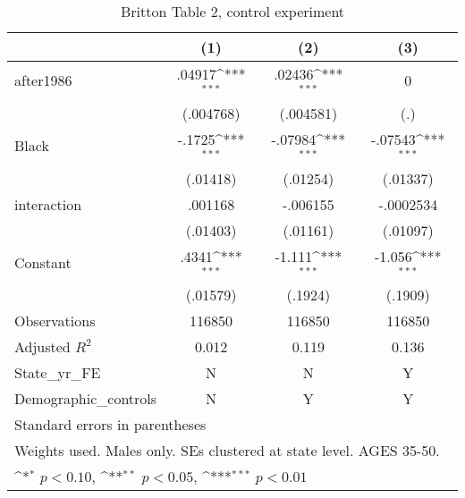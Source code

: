 \begin{table}[htbp]\centering
\def\sym#1{\ifmmode^{#1}\else\(^{#1}\)\fi}
\caption{Britton Table 2, control experiment}
\begin{tabular}{l*{3}{c}}
\hline\hline
                    &\multicolumn{1}{c}{(1)}         &\multicolumn{1}{c}{(2)}         &\multicolumn{1}{c}{(3)}         \\
\hline
after1986           &      .04917\sym{***}&      .02436\sym{***}&           0         \\
                    &   (.004768)         &   (.004581)         &         (.)         \\
[1em]
Black               &      -.1725\sym{***}&     -.07984\sym{***}&     -.07543\sym{***}\\
                    &    (.01418)         &    (.01254)         &    (.01337)         \\
[1em]
interaction         &     .001168         &    -.006155         &   -.0002534         \\
                    &    (.01403)         &    (.01161)         &    (.01097)         \\
[1em]
Constant            &       .4341\sym{***}&      -1.111\sym{***}&      -1.056\sym{***}\\
                    &    (.01579)         &     (.1924)         &     (.1909)         \\
\hline
Observations        &      116850         &      116850         &      116850         \\
Adjusted \(R^{2}\)  &       0.012         &       0.119         &       0.136         \\
State\_yr\_FE         &           N         &           N         &           Y         \\
Demographic\_controls&           N         &           Y         &           Y         \\
\hline\hline
\multicolumn{4}{l}{\footnotesize Standard errors in parentheses}\\
\multicolumn{4}{l}{\footnotesize Weights used. Males only. SEs clustered at state level. AGES 35-50.}\\
\multicolumn{4}{l}{\footnotesize \sym{*} \(p<0.10\), \sym{**} \(p<0.05\), \sym{***} \(p<0.01\)}\\
\end{tabular}
\end{table}
